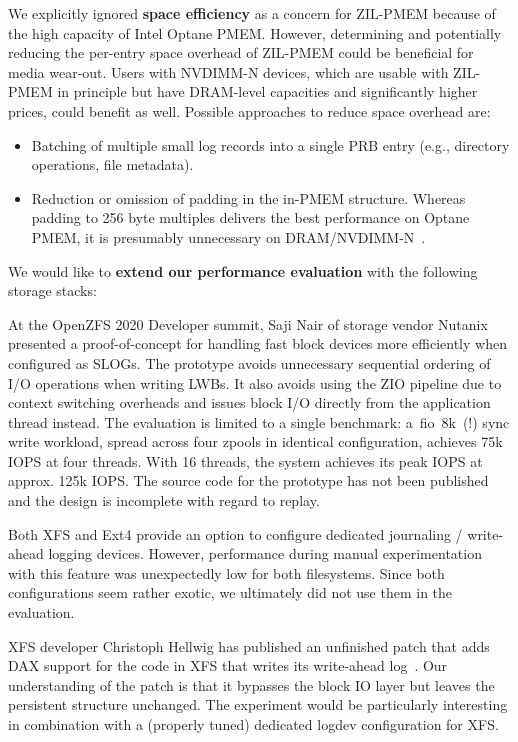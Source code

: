 \documentclass[12pt,a4paper,twoside]{book}
\begin{document}
We explicitly ignored \textbf{space efficiency} as a concern for ZIL-PMEM because of the high capacity of Intel Optane PMEM.
However, determining and potentially reducing the per-entry space overhead of ZIL-PMEM could be beneficial for media wear-out.
Users with NVDIMM-N devices, which are usable with ZIL-PMEM in principle but have DRAM-level capacities and significantly higher prices, could benefit as well.
Possible approaches to reduce space overhead are:
\begin{itemize}[noitemsep]
    \item Batching of multiple small log records into a single PRB entry (e.g., directory operations, file metadata).
    \item Reduction or omission of padding in the in-PMEM structure.
        Whereas padding to 256 byte multiples delivers the best performance on Optane PMEM, it is presumably unnecessary on DRAM/NVDIMM-N~\cite{yangEmpiricalGuideBehavior2020}.
\end{itemize}

We would like to \textbf{extend our performance evaluation} with the following storage stacks:
\begin{description}[noitemsep,leftmargin=1.5cm,labelindent=1cm]
    \item[ZIL ZIO Bypass By Saji Nair]
    At the OpenZFS 2020 Developer summit, Saji Nair of storage vendor Nutanix presented a proof-of-concept for handling fast block devices more efficiently when configured as SLOGs.
    The prototype avoids unnecessary sequential ordering of I/O operations when writing LWBs.
    It also avoids using the ZIO pipeline due to context switching overheads and issues block I/O directly from the application thread instead.
    The evaluation is limited to a single benchmark: a~fio~8k~(!) sync write workload, spread across four zpools in identical configuration, achieves 75k IOPS at four threads.
    With 16 threads, the system achieves its peak IOPS at approx. 125k IOPS.
    The source code for the prototype has not been published and the design is incomplete with regard to replay.~\cite{openzfsZILPerformanceImprovements2020}

    \item[Ext4 journal\_dev / XFS logdev] Both XFS and Ext4 provide an option to configure dedicated journaling / write-ahead logging devices.
        However, performance during manual experimentation with this feature was unexpectedly low for both filesystems.
        Since both configurations seem rather exotic, we ultimately did not use them in the evaluation.

    \item[XFS DAX Log Patch] XFS developer Christoph Hellwig has published an unfinished patch that adds DAX support for the code in XFS that writes its write-ahead log~\cite{LKMLChristophHellwig}.
        Our understanding of the patch is that it bypasses the block IO layer but leaves the persistent structure unchanged.
        The experiment would be particularly interesting in combination with a (properly tuned) dedicated logdev configuration for XFS.
\end{description}
\end{document}

